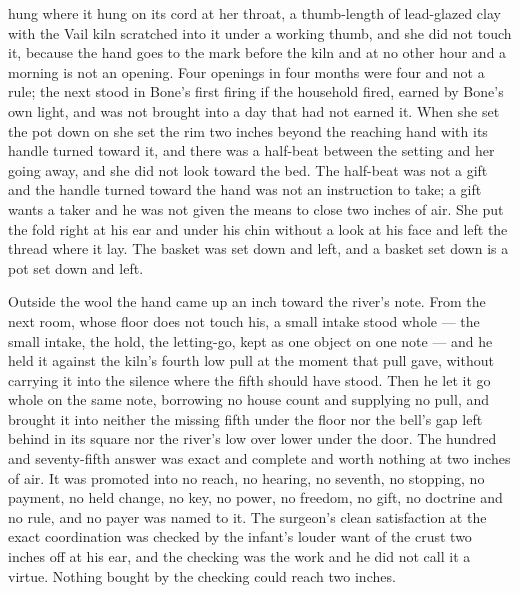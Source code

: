  hung where it hung on its cord at her throat, a thumb-length of lead-glazed clay with the Vail kiln scratched into it under a working thumb, and she did not touch it, because the hand goes to the mark before the kiln and at no other hour and a morning is not an opening. Four openings in four months were four and not a rule; the next stood in Bone's first firing if the household fired, earned by Bone's own light, and was not brought into a day that had not earned it. When she set the pot down on  she set the rim two inches beyond the reaching hand with its handle turned toward it, and there was a half-beat between the setting and her going away, and she did not look toward the bed. The half-beat was not a gift and the handle turned toward the hand was not an instruction to take; a gift wants a taker and he was not given the means to close two inches of air. She put the fold right at his ear and under his chin without a look at his face and left the thread where it lay. The basket was set down and left, and a basket set down is a pot set down and left.

Outside the wool the hand came up an inch toward the river's note. From the next room, whose floor does not touch his, a small intake stood whole --- the small intake, the hold, the letting-go, kept as one object on one note --- and he held it against the kiln's fourth low pull at the moment that pull gave, without carrying it into the silence where the fifth should have stood. Then he let it go whole on the same note, borrowing no house count and supplying no pull, and brought it into neither the missing fifth under the floor nor the bell's gap left behind in its square nor the river's low over lower under the door. The hundred and seventy-fifth answer was exact and complete and worth nothing at two inches of air. It was promoted into no reach, no hearing, no seventh, no stopping, no payment, no held change, no key, no power, no freedom, no gift, no doctrine and no rule, and no payer was named to it. The surgeon's clean satisfaction at the exact coordination was checked by the infant's louder want of the crust two inches off at his ear, and the checking was the work and he did not call it a virtue. Nothing bought by the checking could reach two inches.


